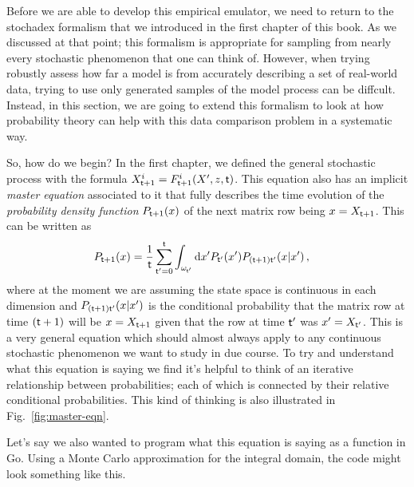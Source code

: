 Before we are able to develop this empirical emulator, we need to return to the stochadex formalism that we introduced in the first chapter of this book. As we discussed at that point; this formalism is appropriate for sampling from nearly every stochastic phenomenon that one can think of. However, when trying robustly assess how far a model is from accurately describing a set of real-world data, trying to use only generated samples of the model process can be diffcult. Instead, in this section, we are going to extend this formalism to look at how probability theory can help with this data comparison problem in a systematic way.

So, how do we begin? In the first chapter, we defined the general stochastic process with the formula $X^{i}_{{\sf t}+1} = F^{i}_{{\sf t}+1}(X',z,{\sf t})$. This equation also has an implicit \emph{master equation} associated to it that fully describes the time evolution of the \emph{probability density function} $P_{{\sf t}+1}(x)$ of the next matrix row being $x=X_{{\sf t}+1}$. This can be written as
\begin{align}
P_{{\sf t}+1}(x) &= \frac{1}{{\sf t}}\sum_{{\sf t}'=0}^{{\sf t}}\int_{\omega_{{\sf t}'}}{\rm d}x' P_{{\sf t}'}(x') P_{({\sf t}+1){\sf t}'}(x\vert x') \label{eq:master-x-cont} \,,
\end{align}
where at the moment we are assuming the state space is continuous in each dimension and $P_{({\sf t}+1){\sf t}'}(x\vert x')$ is the conditional probability that the matrix row at time $({\sf t}+1)$ will be $x=X_{{\sf t}+1}$ given that the row at time ${\sf t}'$ was $x'=X_{{\sf t}'}$. This is a very general equation which should almost always apply to any continuous stochastic phenomenon we want to study in due course. To try and understand what this equation is saying we find it's helpful to think of an iterative relationship between probabilities; each of which is connected by their relative conditional probabilities. This kind of thinking is also illustrated in Fig.~\ref{fig:master-eqn}. 

Let's say we also wanted to program what this equation is saying as a function in Go. Using a Monte Carlo approximation for the integral domain, the code might look something like this.


